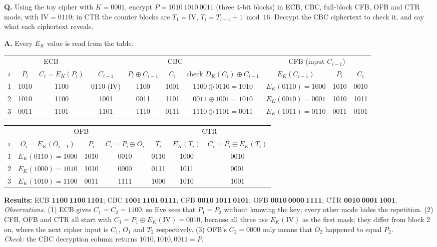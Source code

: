 \begin{worked}
\textbf{Q.} Using the toy cipher with $K = 0001$, encrypt $P = 1010\ 1010\ 0011$ (three 4-bit blocks) in ECB, CBC, full-block CFB, OFB and CTR mode, with $\mathrm{IV} = 0110$; in CTR the counter blocks are $T_1 = \mathrm{IV}$, $T_i = T_{i-1} + 1 \bmod 16$. Decrypt the CBC ciphertext to check it, and say what each ciphertext reveals.

\textbf{A.} Every $E_K$ value is read from the table.
\begin{center}\small
\begin{tabular}{@{}c|cc|cccc|ccc@{}}
\toprule
 & \multicolumn{2}{c|}{ECB} & \multicolumn{4}{c|}{CBC} & \multicolumn{3}{c}{CFB (input $C_{i-1}$)}\\
$i$ & $P_i$ & $C_i = E_K(P_i)$ & $C_{i-1}$ & $P_i \oplus C_{i-1}$ & $C_i$ & check $D_K(C_i) \oplus C_{i-1}$ & $E_K(C_{i-1})$ & $P_i$ & $C_i$\\
\midrule
1 & 1010 & 1100 & 0110 (IV) & 1100 & 1001 & $1100 \oplus 0110 = 1010$ & $E_K(0110) = 1000$ & 1010 & 0010\\
2 & 1010 & 1100 & 1001 & 0011 & 1101 & $0011 \oplus 1001 = 1010$ & $E_K(0010) = 0001$ & 1010 & 1011\\
3 & 0011 & 1101 & 1101 & 1110 & 0111 & $1110 \oplus 1101 = 0011$ & $E_K(1011) = 0110$ & 0011 & 0101\\
\bottomrule
\end{tabular}

\vspace{4pt}
\begin{tabular}{@{}c|ccc|ccc@{}}
\toprule
 & \multicolumn{3}{c|}{OFB} & \multicolumn{3}{c}{CTR}\\
$i$ & $O_i = E_K(O_{i-1})$ & $P_i$ & $C_i = P_i \oplus O_i$ & $T_i$ & $E_K(T_i)$ & $C_i = P_i \oplus E_K(T_i)$\\
\midrule
1 & $E_K(0110) = 1000$ & 1010 & 0010 & 0110 & 1000 & 0010\\
2 & $E_K(1000) = 1010$ & 1010 & 0000 & 0111 & 1011 & 0001\\
3 & $E_K(1010) = 1100$ & 0011 & 1111 & 1000 & 1010 & 1001\\
\bottomrule
\end{tabular}
\end{center}
\textbf{Results:} ECB $\mathbf{1100\ 1100\ 1101}$; CBC $\mathbf{1001\ 1101\ 0111}$; CFB $\mathbf{0010\ 1011\ 0101}$; OFB $\mathbf{0010\ 0000\ 1111}$; CTR $\mathbf{0010\ 0001\ 1001}$.\\
\emph{Observations.} (1) ECB gives $C_1 = C_2 = 1100$, so Eve sees that $P_1 = P_2$ without knowing the key; every other mode hides the repetition. (2) CFB, OFB and CTR all start with $C_1 = P_1 \oplus E_K(\mathrm{IV}) = 0010$, because all three use $E_K(\mathrm{IV})$ as the first mask; they differ from block 2 on, where the next cipher input is $C_1$, $O_1$ and $T_2$ respectively. (3) OFB's $C_2 = 0000$ only means that $O_2$ happened to equal $P_2$.\\
\emph{Check:} the CBC decryption column returns $1010, 1010, 0011 = P$.
\end{worked}

